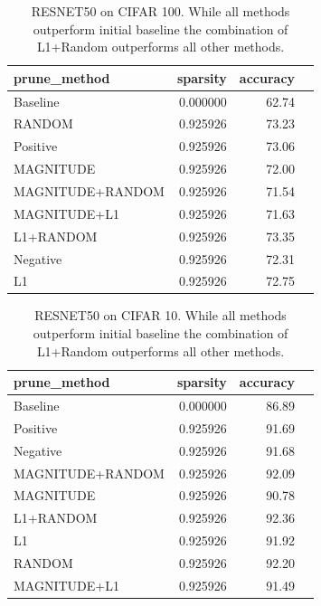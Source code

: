 \documentclass[11pt]{article}
\begin{document}
\begin{table}[h]
\begin{tabular}{|l|r|r|r|}
\hline
     prune\_method &  sparsity &  accuracy \\ \hline
           Baseline &  0.000000 &     62.74 \\ \hline
           RANDOM &  0.925926 &     73.23 \\ \hline
         Positive &  0.925926 &     73.06 \\ \hline
        MAGNITUDE &  0.925926 &     72.00 \\ \hline
 MAGNITUDE+RANDOM &  0.925926 &     71.54 \\ \hline
     MAGNITUDE+L1 &  0.925926 &     71.63 \\ \hline
        L1+RANDOM &  0.925926 &     73.35 \\ \hline
         Negative &  0.925926 &     72.31 \\ \hline
               L1 &  0.925926 &     72.75 \\ \hline
\end{tabular}
\label{tab:cifar100-RESNET50}
\caption{RESNET50 on CIFAR 100. While all methods outperform initial baseline the combination of L1+Random outperforms all other methods.}
\end{table}

\begin{table}[h]
\begin{tabular}{|l|r|r|r|}
\hline
     prune\_method &  sparsity &  accuracy \\ \hline
         Baseline &  0.000000 &     86.89 \\ \hline
         Positive &  0.925926 &     91.69 \\ \hline
         Negative &  0.925926 &     91.68 \\ \hline
 MAGNITUDE+RANDOM &  0.925926 &     92.09 \\ \hline
        MAGNITUDE &  0.925926 &     90.78 \\ \hline
        L1+RANDOM &  0.925926 &     92.36 \\ \hline
               L1 &  0.925926 &     91.92 \\ \hline
           RANDOM &  0.925926 &     92.20 \\ \hline
     MAGNITUDE+L1 &  0.925926  &     91.49 \\ \hline
\end{tabular}
\label{tab:cifar10-RESNET50}
\caption{RESNET50 on CIFAR 10. While all methods outperform initial baseline the combination of L1+Random outperforms all other methods.}
\end{table}
\end{document}
